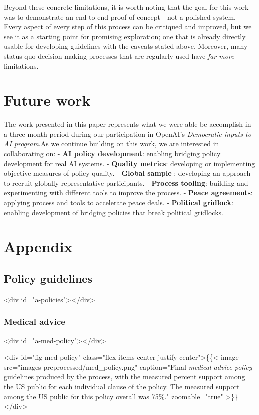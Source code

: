 \documentclass{article}
\begin{document}
Beyond these concrete limitations, it is worth noting that the goal for this work was to demonstrate an end-to-end proof of concept---not a polished system. Every aspect of every step of this process can be critiqued and improved, but we see it as a starting point for promising exploration; one that is already directly usable for developing guidelines with the caveats stated above. Moreover, many status quo decision-making processes that are regularly used have \emph{far more} limitations.

\section{Future work}

The work presented in this paper represents what we were able be accomplish in a three month period during our participation in OpenAI's \emph{Democratic inputs to AI program}.As we continue building on this work, we are interested in collaborating on:
-  \textbf{AI policy development}: enabling bridging policy development for real AI systems.
-  \textbf{Quality metrics}: developing or implementing objective measures of policy quality.
-  \textbf{Global sample} : developing an approach to recruit globally representative participants.
-  \textbf{Process tooling}: building and experimenting with different tools to improve the process.
-  \textbf{Peace agreements}: applying process and tools to accelerate peace deals.
-  \textbf{Political gridlock}: enabling development of bridging policies that break political gridlocks.




\appendix\section{Appendix}

\subsection{Policy guidelines}<div id="a-policies"></div>


\subsubsection{Medical advice}<div id="a-med-policy"></div>

<div id="fig-med-policy" class="flex items-center justify-center">\{\{< image src="images-preprocessed/med_policy.png" caption="Final \emph{medical advice policy} guidelines produced by the process, with the measured percent support among the US public for each individual clause of the policy. The measured support among the US public for this policy overall was 75\%." zoomable="true" >\}\}</div>
\end{document}

